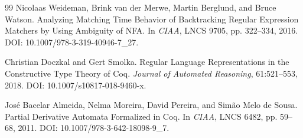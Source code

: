 \documentclass[UTF8,a4paper,12pt]{ctexart}
\begin{document}
\begin{thebibliography}{99}
Nicolaas Weideman, Brink van der Merwe, Martin Berglund, and Bruce Watson.
\newblock Analyzing Matching Time Behavior of Backtracking Regular Expression Matchers by Using Ambiguity of NFA.
\newblock In \emph{CIAA}, LNCS 9705, pp. 322--334, 2016.
\newblock DOI: 10.1007/978-3-319-40946-7\_27.

Christian Doczkal and Gert Smolka.
\newblock Regular Language Representations in the Constructive Type Theory of Coq.
\newblock \emph{Journal of Automated Reasoning}, 61:521--553, 2018.
\newblock DOI: 10.1007/s10817-018-9460-x.

Jos\'e Bacelar Almeida, Nelma Moreira, David Pereira, and Sim\~ao Melo de Sousa.
\newblock Partial Derivative Automata Formalized in Coq.
\newblock In \emph{CIAA}, LNCS 6482, pp. 59--68, 2011.
\newblock DOI: 10.1007/978-3-642-18098-9\_7.

\end{thebibliography}
\end{document}
